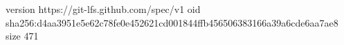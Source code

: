version https://git-lfs.github.com/spec/v1
oid sha256:d4aa3951e5e62c78fe0e452621cd001844ffb456506383166a39a6cde6aa7ae8
size 471

